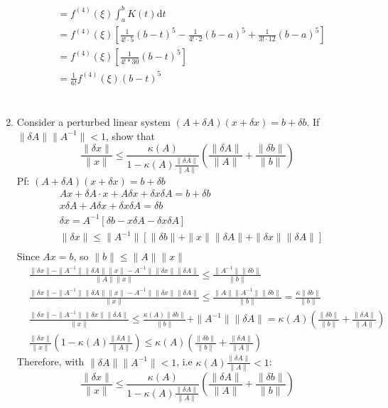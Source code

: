 \documentclass[12pt]{article}
\begin{document}
\begin{enumerate}
\begin{align*}
&=f^{(4)}(\xi) \int_a^b K(t)\mathrm{d}t\\
&=f^{(4)}(\xi) [\frac{1}{4!\cdot5}(b-t)^{5}-\frac{1}{4!\cdot2}(b-a)^5+\frac{1}{3!\cdot12}(b-a)^5]\\
&=f^{(4)}(\xi)[\frac{1}{4!*30}(b-t)^{5}]\\
&=\frac{1}{6!}f^{(4)}(\xi)(b-t)^{5}\\
\end{align*}
\
\item Consider a perturbed linear system $(A+\delta A)(x+\delta x) = b + \delta b$.  If $\| \delta A \| \| A^{-1} \| < 1$, show that
$$
\frac{\| \delta x \|}{\|x \|} \leq \frac{\kappa(A)}{1-\kappa(A) \frac{ \| \delta A\|}{\| A \|}} \left(  \frac{\| \delta A \|}{\| A \|} + \frac{\| \delta b \|}{\| b \|} \right)
$$
Pf: $(A+\delta A)(x+\delta x) = b + \delta b$\\
\begin{align*}
& Ax+\delta A\cdot x+A \delta x+\delta x \delta A = b + \delta b\\
& x\delta A+A \delta x+\delta x \delta A = \delta b\\
& \delta x = A^{-1}[\delta b-x\delta A-\delta x \delta A]\\
& \|\delta x \|\leq \| A^{-1}\|[\|\delta b\|+\|x\|\|\delta A\|+\|\delta x\| \|\delta A\|]\\
\end{align*}
Since $Ax=b$, so $\|b\|\leq \|A\|\|x\|$ \\
\begin{align*}
& \frac {\|\delta x \|-\| A^{-1}\|\|\delta A\|\|x\|-A^{-1}\|\|\delta x\| \|\delta A\|}{\|A\|\|x\|}\leq \frac {\| A^{-1}\|\|\delta b\|}{\|b\|}\\
& \frac {\|\delta x \|-\| A^{-1}\|\|\delta A\|\|x\|-A^{-1}\|\|\delta x\| \|\delta A\|}{\|x\|}\leq \frac {\|A\|\| A^{-1}\|\|\delta b\|}{\|b\|}=\frac {\kappa \|\delta b\|}{\|b\|}\\
& \frac {\|\delta x \|-\|A^{-1}\|\|\delta x\| \|\delta A\|}{\|x\|}\leq \frac {\kappa(A) \|\delta b\|}{\|b\|}+\| A^{-1}\|\|\delta A\|=\kappa(A) (\frac{\|\delta b\|}{\|b\|}+\frac{\|\delta A\|}{\|A\|})\\
& \frac {\|\delta x \|}{\|x\|}(1-\kappa(A) \frac {\|\delta A \|}{\|A\|}) \leq \kappa(A)(\frac{\|\delta b\|}{\|b\|}+\frac{\|\delta A\|}{\|A\|})
\end{align*}
Therefore, with $\| \delta A \| \| A^{-1} \| < 1$, i.e $\kappa(A) \frac {\|\delta A \|}{\|A\|}<1$:\\
$$
\frac{\| \delta x \|}{\|x \|} \leq \frac{\kappa(A)}{1-\kappa(A) \frac{ \| \delta A\|}{\| A \|}} \left(  \frac{\| \delta A \|}{\| A \|} + \frac{\| \delta b \|}{\| b \|} \right)
$$
\end{enumerate}
\end{document}
